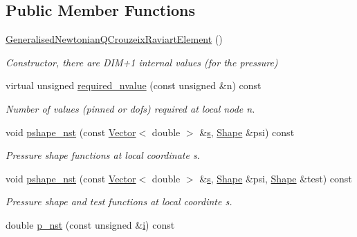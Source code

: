 \subsection*{Public Member Functions}
\begin{DoxyCompactItemize}
\item 
\hyperlink{classoomph_1_1GeneralisedNewtonianQCrouzeixRaviartElement_ae8fca2b2f5812bc5651e5c57e73e840e}{Generalised\+Newtonian\+Q\+Crouzeix\+Raviart\+Element} ()
\begin{DoxyCompactList}\small\item\em Constructor, there are D\+I\+M+1 internal values (for the pressure) \end{DoxyCompactList}\item 
virtual unsigned \hyperlink{classoomph_1_1GeneralisedNewtonianQCrouzeixRaviartElement_aaa3786b1a111c82a5ee7ee47e8e45eb0}{required\+\_\+nvalue} (const unsigned \&n) const
\begin{DoxyCompactList}\small\item\em Number of values (pinned or dofs) required at local node n. \end{DoxyCompactList}\item 
void \hyperlink{classoomph_1_1GeneralisedNewtonianQCrouzeixRaviartElement_ac67f51cf0d592e011ea165f62ff8976e}{pshape\+\_\+nst} (const \hyperlink{classoomph_1_1Vector}{Vector}$<$ double $>$ \&\hyperlink{cfortran_8h_ab7123126e4885ef647dd9c6e3807a21c}{s}, \hyperlink{classoomph_1_1Shape}{Shape} \&psi) const
\begin{DoxyCompactList}\small\item\em Pressure shape functions at local coordinate s. \end{DoxyCompactList}\item 
void \hyperlink{classoomph_1_1GeneralisedNewtonianQCrouzeixRaviartElement_aaf51b44d72cceba2115671c6d99cb38c}{pshape\+\_\+nst} (const \hyperlink{classoomph_1_1Vector}{Vector}$<$ double $>$ \&\hyperlink{cfortran_8h_ab7123126e4885ef647dd9c6e3807a21c}{s}, \hyperlink{classoomph_1_1Shape}{Shape} \&psi, \hyperlink{classoomph_1_1Shape}{Shape} \&test) const
\begin{DoxyCompactList}\small\item\em Pressure shape and test functions at local coordinte s. \end{DoxyCompactList}\item 
double \hyperlink{classoomph_1_1GeneralisedNewtonianQCrouzeixRaviartElement_aa4293ea7acc0f6bc4cd9e7fe2248b726}{p\+\_\+nst} (const unsigned \&\hyperlink{cfortran_8h_adb50e893b86b3e55e751a42eab3cba82}{i}) const

\end{DoxyCompactItemize}
